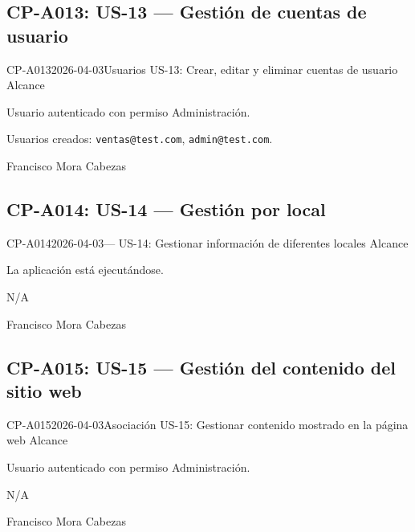 \subsection{CP-A013: US-13 --- Gestión de cuentas de usuario}
\def\cpPasos{%
  \item Crear usuarios con diferentes permisos (probado en CP-M005 y CP-I002).
  \item Editar usuario \texttt{ventas@test.com} --- modificar un dato.
  \item Verificar lista de usuarios.}
\def\cpResultadoE{%
  \item CRUD completo de usuarios funciona incluyendo asignación de permisos.}
\def\cpResultadoO{La creación, edición y visualización de usuarios funcionan
  correctamente. Los permisos se aplican correctamente al iniciar sesión.}
\casoprueba
  {CP-A013}{2026-04-03}{Usuarios}
  {US-13: Crear, editar y eliminar cuentas de usuario}
  {Alcance}{\estadoAprobado}
  {\item Usuario autenticado con permiso Administración.}
  {\item Usuarios creados: \texttt{ventas@test.com}, \texttt{admin@test.com}.}
  {Francisco Mora Cabezas}

\subsection{CP-A014: US-14 --- Gestión por local}
\def\cpPasos{%
  \item Revisar todos los módulos del menú buscando gestión de locales.}
\def\cpResultadoE{%
  \item Existe un módulo para gestionar locales o puntos de venta.}
\def\cpResultadoO{\textcolor{rojo}{No existe ningún módulo ni sección para gestión
  de locales en la interfaz. La User Story US-14 no está implementada en esta versión.}
  (Ver HAL-006)}
\casoprueba
  {CP-A014}{2026-04-03}{---}
  {US-14: Gestionar información de diferentes locales}
  {Alcance}{\estadoNoImpl}
  {\item La aplicación está ejecutándose.}
  {\item N/A}
  {Francisco Mora Cabezas}

\subsection{CP-A015: US-15 --- Gestión del contenido del sitio web}
\def\cpPasos{%
  \item Navegar a Asociación.
  \item Verificar si existe sección para gestionar contenido web.}
\def\cpResultadoE{%
  \item Existe funcionalidad para gestionar el contenido del sitio web.}
\def\cpResultadoO{En la sección de Asociación existe una subsección de
  ``Carruseles Web'' que permite subir imágenes para mostrar en el sitio web.
  La funcionalidad de gestión de contenido web está disponible.}
\casoprueba
  {CP-A015}{2026-04-03}{Asociación}
  {US-15: Gestionar contenido mostrado en la página web}
  {Alcance}{\estadoAprobado}
  {\item Usuario autenticado con permiso Administración.}
  {\item N/A}
  {Francisco Mora Cabezas}

